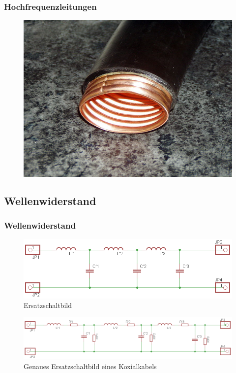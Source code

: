 \begin{frame}
  \frametitle{Hochfrequenzleitungen}
  \begin{center}
    \begin{figure}
      \includegraphics[width=1\textwidth,height=.7\textheight,keepaspectratio]{e10/hohl.jpg}
    \end{figure}
\end{center}
\end{frame}

\subsection*{Wellen\-widerstand}
\begin{frame}
  \frametitle{Wellenwiderstand}
  \begin{figure}
    \includegraphics[width=1\textwidth,height=.3\textheight,keepaspectratio]{e10/wellenesb.png}
    \caption{Ersatzschaltbild}
  \end{figure}
  \begin{figure}
    \includegraphics[width=1\textwidth,height=.3\textheight,keepaspectratio]{e10/wellenesbex.png}
    \caption{Genaues Ersatzschaltbild eines Koxialkabels}
  \end{figure}
\end{frame}

